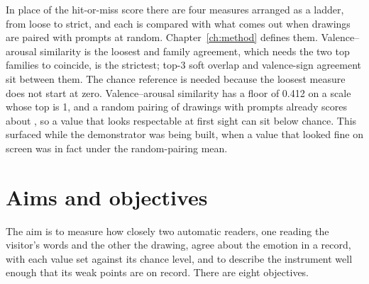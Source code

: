 In place of the hit-or-miss score there are four measures arranged as a ladder, from loose to strict, and each is compared with what comes out when drawings are paired with prompts at random. Chapter~\ref{ch:method} defines them. Valence--arousal similarity is the loosest and family agreement, which needs the two top families to coincide, is the strictest; top-3 soft overlap and valence-sign agreement sit between them. The chance reference is needed because the loosest measure does not start at zero. Valence--arousal similarity has a floor of 0.412 on a scale whose top is 1, and a random pairing of drawings with prompts already scores about \FullNeuVaNull{}, so a value that looks respectable at first sight can sit below chance. This surfaced while the demonstrator was being built, when a value that looked fine on screen was in fact under the random-pairing mean.

\section{Aims and objectives}
\label{sec:intro-aims}

The aim is to measure how closely two automatic readers, one reading the visitor's words and the other the drawing, agree about the emotion in a record, with each value set against its chance level, and to describe the instrument well enough that its weak points are on record. There are eight objectives.

